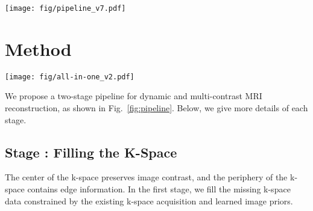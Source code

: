 \documentclass[runningheads]{llncs}
\newcommand{\RNum}[1]{\uppercase\expandafter{\romannumeral #1\relax}}
\begin{document}
 
\begin{figure*}[t!]
\centering
\texttt{[image: fig/pipeline\_v7.pdf]}
\caption{The proposed two-stage MRI reconstruction pipeline. The first stage solves a physics-based inverse problem to fill the missing k-space data, which are then transformed to the image domain by the inverse Fast Fourier Transformation (IFFT) and root-sum-of-squares (RSS) is applied to get the first-stage reconstructed image. The second stage solves a general denoising problem to further refine the image reconstruction result.}

\label{fig:pipeline}
\end{figure*}

\section{Method}

\begin{figure*}[t!]
\centering
\texttt{[image: fig/all-in-one\_v2.pdf]}
\caption{Overview of PromptMR in Stage \RNum{1}: an all-in-one unrolled model for MRI reconstruction. Adjacent inputs, depicted in image domain for visual clarity, provide neighboring k-space information for reconstruction. To accommodate different input varieties, the input-type adaptive visual prompt is integrated into each cascade of the unrolled architecture to guide the reconstruction process.}
\label{fig:all-in-one}
\end{figure*}

We propose a two-stage pipeline for dynamic and multi-contrast MRI reconstruction, as shown in Fig.~\ref{fig:pipeline}. Below, we give more details of each stage.


\subsection{Stage \RNum{1}: Filling the K-Space}
The center of the k-space preserves image contrast, and the periphery of the k-space contains edge information. In the first stage, we fill the missing k-space data constrained by the existing k-space acquisition and learned image priors.
\end{document}
